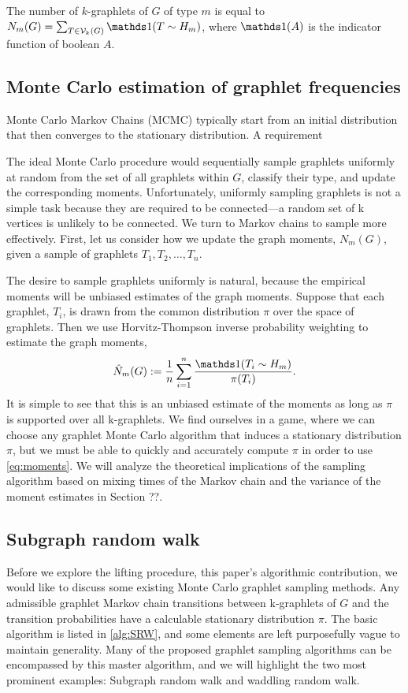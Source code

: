 	The number of $k$-graphlets of $G$ of type $m$ is equal to 
	$N_m (G) = \sum_{T \in \cV_k(G)} \ind(T \sim H_m)$, where $\ind(A)$ 
	is the indicator function of boolean $A$.

    \subsection{Monte Carlo estimation of graphlet frequencies}
	
	    Monte Carlo Markov Chains (MCMC) typically start from an initial distribution that then converges to the stationary distribution.
    A requirement 

    The ideal Monte Carlo procedure would sequentially sample graphlets uniformly at random from the set of all graphlets within $G$, classify their type, and update the corresponding moments.  
Unfortunately, uniformly sampling graphlets is not a simple task because they are required to be connected---a random set of k vertices is unlikely to be connected.
We turn to Markov chains to sample more effectively.
First, let us consider how we update the graph moments, $N_m(G)$, given a sample of graphlets $T_1, T_2, \ldots, T_n$.

The desire to sample graphlets uniformly is natural, because the empirical moments will be unbiased estimates of the graph moments.
Suppose that each graphlet, $T_i$, is drawn from the common distribution $\pi$ over the space of graphlets.
Then we use Horvitz-Thompson inverse probability weighting to estimate the graph moments,
\begin{equation}
  \label{eq:moments}
  \hat N_m(G) := \frac{1}{n} \sum_{i=1}^n \frac{\ind(T_i\sim H_m)}{\pi(T_i)}.  
\end{equation}
It is simple to see that this is an unbiased estimate of the moments as long as $\pi$ is supported over all k-graphlets.
We find ourselves in a game, where we can choose any graphlet Monte Carlo algorithm that induces a stationary distribution $\pi$, but we must be able to quickly and accurately compute $\pi$ in order to use \eqref{eq:moments}.
We will analyze the theoretical implications of the sampling algorithm based on mixing times of the Markov chain and the variance of the moment estimates in Section ??.

\subsection{Subgraph random walk}

Before we explore the lifting procedure, this paper's algorithmic contribution, we would like to discuss some existing Monte Carlo graphlet sampling methods.
Any admissible graphlet Markov chain transitions between k-graphlets of $G$ and the transition probabilities have a calculable stationary distribution $\pi$.
The basic algorithm is listed in \ref{alg:SRW}, and some elements are left purposefully vague to maintain generality.
Many of the proposed graphlet sampling algorithms can be encompassed by this master algorithm, and we will highlight the two most prominent examples: Subgraph random walk and waddling random walk.

